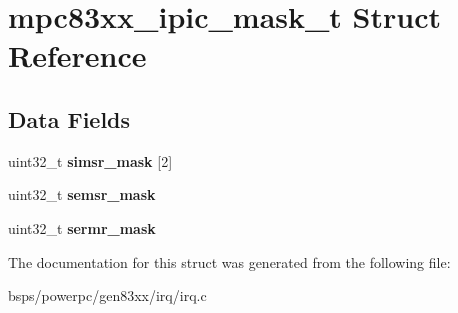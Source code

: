 \hypertarget{structmpc83xx__ipic__mask__t}{}\section{mpc83xx\+\_\+ipic\+\_\+mask\+\_\+t Struct Reference}
\label{structmpc83xx__ipic__mask__t}
\subsection*{Data Fields}
\begin{DoxyCompactItemize}
\item 
\mbox{\label{structmpc83xx__ipic__mask__t_a82d3d1d27dd039dc1ad51af6b17e45de}} 
uint32\+\_\+t {\bfseries simsr\+\_\+mask} \mbox{[}2\mbox{]}
\item 
\mbox{\label{structmpc83xx__ipic__mask__t_af59cbebb9ee35b528f389796cd2a42e3}} 
uint32\+\_\+t {\bfseries semsr\+\_\+mask}
\item 
\mbox{\label{structmpc83xx__ipic__mask__t_a533c984b09dbbe48549fc01511690cf8}} 
uint32\+\_\+t {\bfseries sermr\+\_\+mask}
\end{DoxyCompactItemize}


The documentation for this struct was generated from the following file\+:\begin{DoxyCompactItemize}
\item 
bsps/powerpc/gen83xx/irq/irq.\+c\end{DoxyCompactItemize}
